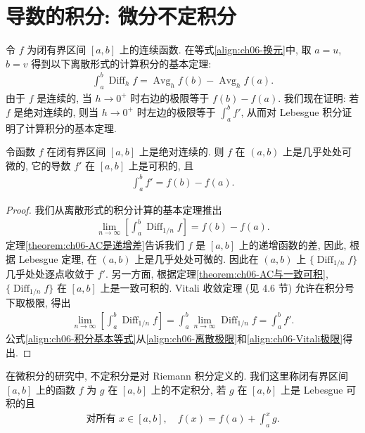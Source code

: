 \documentclass[../../main.tex]{subfiles}
\begin{document}
\section{导数的积分: 微分不定积分}\label{section:ch06-导数积分}

令 $f$ 为闭有界区间 $[a,b]$ 上的连续函数. 在等式\eqref{align:ch06-换元}中, 取 $a=u$, $b=v$ 得到以下离散形式的计算积分的基本定理:
\begin{align*}
\int_{a}^{b}\operatorname{Diff}_{h}f=\operatorname{Avg}_{h}f(b)-\operatorname{Avg}_{h}f(a).
\end{align*}
由于 $f$ 是连续的, 当 $h\to 0^{+}$ 时右边的极限等于 $f(b)-f(a)$. 我们现在证明: 若 $f$ 是绝对连续的, 则当 $h\to 0^{+}$ 时左边的极限等于 $\int_{a}^{b}f'$, 从而对 Lebesgue 积分证明了计算积分的基本定理.

\begin{theorem}\label{theorem:ch06-AC导数积分}
令函数 $f$ 在闭有界区间 $[a,b]$ 上是绝对连续的. 则 $f$ 在 $(a,b)$ 上是几乎处处可微的, 它的导数 $f'$ 在 $[a,b]$ 上是可积的, 且
\begin{align}
\int_{a}^{b}f'=f(b)-f(a).\label{align:ch06-积分基本等式}
\end{align}
\end{theorem}

\begin{proof}
我们从离散形式的积分计算的基本定理推出
\begin{align}
\lim_{n\to\infty}\left[\int_{a}^{b}\operatorname{Diff}_{1/n}f\right]=f(b)-f(a).\label{align:ch06-离散极限}
\end{align}
定理\cref{theorem:ch06-AC是递增差}告诉我们 $f$ 是 $[a,b]$ 上的递增函数的差, 因此, 根据 Lebesgue 定理, 在 $(a,b)$ 上是几乎处处可微的. 因此在 $(a,b)$ 上 $\{\operatorname{Diff}_{1/n}f\}$ 几乎处处逐点收敛于 $f'$. 另一方面, 根据定理\cref{theorem:ch06-AC与一致可积}, $\{\operatorname{Diff}_{1/n}f\}$ 在 $[a,b]$ 上是一致可积的. Vitali 收敛定理 (见 4.6 节) 允许在积分号下取极限, 得出
\begin{align}
\lim_{n\to\infty}\left[\int_{a}^{b}\operatorname{Diff}_{1/n}f\right]=\int_{a}^{b}\lim_{n\to\infty}\operatorname{Diff}_{1/n}f=\int_{a}^{b}f'.\label{align:ch06-Vitali极限}
\end{align}
公式\eqref{align:ch06-积分基本等式}从\eqref{align:ch06-离散极限}和\eqref{align:ch06-Vitali极限}得出.
\end{proof}

在微积分的研究中, 不定积分是对 Riemann 积分定义的. 我们这里称闭有界区间 $[a,b]$ 上的函数 $f$ 为 $g$ 在 $[a,b]$ 上的不定积分, 若 $g$ 在 $[a,b]$ 上是 Lebesgue 可积的且
\begin{align}
\text{对所有 }x\in[a,b],\quad f(x)=f(a)+\int_{a}^{x}g.\label{align:ch06-不定积分}
\end{align}
\end{document}
